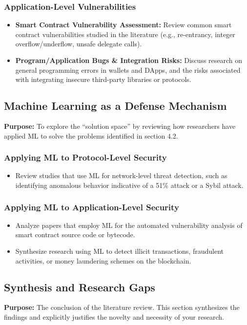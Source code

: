 \subsubsection{Application-Level Vulnerabilities}
\begin{itemize}
	\item \textbf{Smart Contract Vulnerability Assessment:} Review common smart contract vulnerabilities studied in the literature (e.g., re-entrancy, integer overflow/underflow, unsafe delegate calls).
	\item \textbf{Program/Application Bugs \& Integration Risks:} Discuss research on general programming errors in wallets and DApps, and the risks associated with integrating insecure third-party libraries or protocols.
\end{itemize}
	
\subsection{Machine Learning as a Defense Mechanism}
\textbf{Purpose:} To explore the ``solution space'' by reviewing how researchers have applied ML to solve the problems identified in section 4.2.
	
\subsubsection{Applying ML to Protocol-Level Security}
\begin{itemize}
	\item Review studies that use ML for network-level threat detection, such as identifying anomalous behavior indicative of a 51\% attack or a Sybil attack.
\end{itemize}
	
\subsubsection{Applying ML to Application-Level Security}
\begin{itemize}
	\item Analyze papers that employ ML for the automated vulnerability analysis of smart contract source code or bytecode.
	\item Synthesize research using ML to detect illicit transactions, fraudulent activities, or money laundering schemes on the blockchain.
\end{itemize}
	
\subsection{Synthesis and Research Gaps}
\textbf{Purpose:} The conclusion of the literature review. This section synthesizes the findings and explicitly justifies the novelty and necessity of your research.
	
